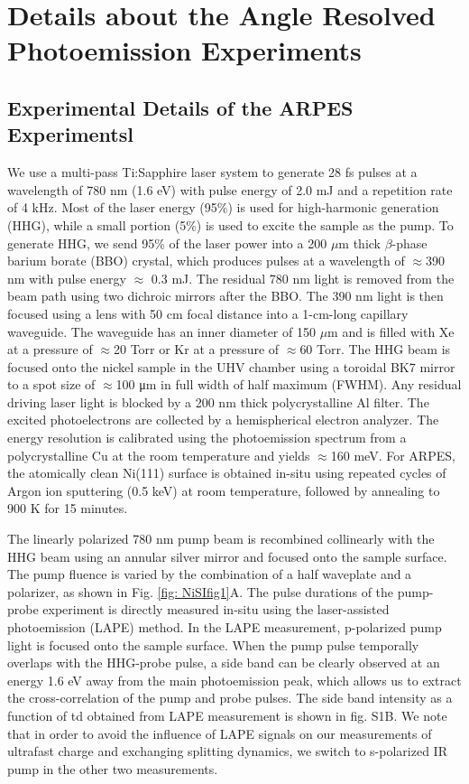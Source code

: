 \chapter{Details about the Angle Resolved Photoemission Experiments}	%

\section{Experimental Details of the ARPES Experimentsl}
We use a multi-pass Ti:Sapphire laser system to generate 28 fs pulses at a wavelength of 780 nm (1.6 eV) with pulse energy of 2.0 mJ and a repetition rate of 4 kHz. Most of the laser energy (95\%) is used for high-harmonic generation (HHG), while a small portion (5\%) is used to excite the sample as the pump. To generate HHG, we send 95\% of the laser power into a 200 $\mu$m thick $\beta$-phase barium borate (BBO) crystal, which produces pulses at a wavelength of $\approx$390 nm with pulse energy $\approx$ 0.3 mJ. The residual 780 nm light is removed from the beam path using two dichroic mirrors after the BBO. The 390 nm light is then focused using a lens with 50 cm focal distance into a 1-cm-long capillary waveguide. The waveguide has an inner diameter of 150 $\mu$m and is filled with Xe at a pressure of $\approx$20 Torr or Kr at a pressure of $\approx$60 Torr. The HHG beam is focused onto the nickel sample in the UHV chamber using a toroidal BK7 mirror to a spot size of $\approx$100 μm in full width of half maximum (FWHM). Any residual driving laser light is blocked by a 200 nm thick polycrystalline Al filter. The excited photoelectrons are collected by a hemispherical electron analyzer. The energy resolution is calibrated using the photoemission spectrum from a polycrystalline Cu at the room temperature and yields $\approx$160 meV. For ARPES, the atomically clean Ni(111) surface is obtained in-situ using repeated cycles of Argon ion sputtering (0.5 keV) at room temperature, followed by annealing to 900 K for 15 minutes.

The linearly polarized 780 nm pump beam is recombined collinearly with the HHG beam using an annular silver mirror and focused onto the sample surface. The pump fluence is varied by the combination of a half waveplate and a polarizer, as shown in Fig. \ref{fig: NiSIfig1}A. The pulse durations of the pump-probe experiment is directly measured in-situ using the laser-assisted photoemission (LAPE) method. In the LAPE measurement, p-polarized pump light is focused onto the sample surface. When the pump pulse temporally overlaps with the HHG-probe pulse, a side band can be clearly observed at an energy 1.6 eV away from the main photoemission peak, which allows us to extract the cross-correlation of the pump and probe pulses. The side band intensity as a function of td obtained from LAPE measurement is shown in fig. S1B. We note that in order to avoid the influence of LAPE signals on our measurements of ultrafast charge and exchanging splitting dynamics, we switch to s-polarized IR pump in the other two measurements.

